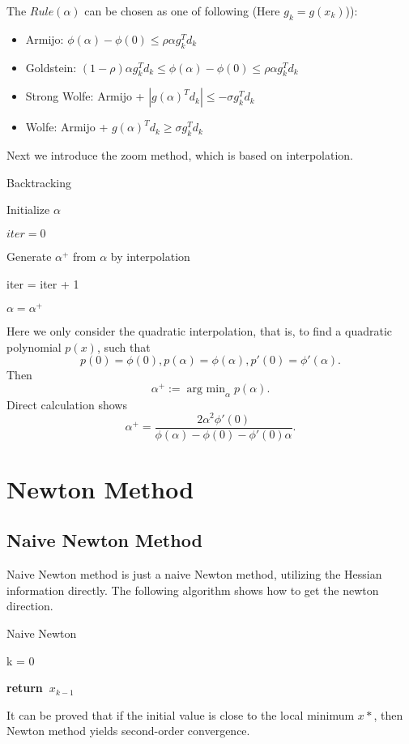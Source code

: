 \documentclass{article}
\newcommand{\return}{\textbf{return~}}
\DeclareMathOperator{\argmin}{arg~min}
\begin{document}
The $Rule(\alpha)$ can be chosen as one of following (Here $g_k = g(x_k)$)):
\begin{itemize}
	\item Armijo: $\phi(\alpha) - \phi(0) \le \rho\alpha g_k^Td_k$
	\item Goldstein:  $(1-\rho)\alpha g_k^Td_k \le \phi(\alpha) - \phi(0) \le \rho\alpha g_k^Td_k$
	\item Strong Wolfe: Armijo + $|g(\alpha)^Td_k| \le -\sigma g_k^Td_k$
	\item Wolfe: Armijo +  $g(\alpha)^Td_k \ge \sigma g_k^Td_k$
\end{itemize}

Next we introduce the zoom method, which is based on interpolation. 

\begin{algorithm}[H]
	\caption{Backtracking}
	\KwIn{$\phi$}
	\KwOut{$\alpha$}
	Initialize $\alpha$
	
	$iter = 0$
	
	{Generate $\alpha^+$ from $\alpha$ by interpolation
		
		iter = iter + 1
	
$\alpha = \alpha^+$}
\end{algorithm}
Here we only consider the quadratic interpolation, that is, to find a quadratic polynomial $p(x)$, such that $$p(0) = \phi(0), p(\alpha) = \phi(\alpha), p'(0) = \phi'(\alpha).$$ Then $$\alpha^+ := \argmin_{\alpha} p(\alpha).$$ Direct calculation shows 
$$\alpha^+ = \frac{2\alpha^2\phi'(0)}{\phi(\alpha) - \phi(0) - \phi'(0)\alpha}.$$


\section{Newton Method}
\subsection{Naive Newton Method}
Naive Newton method is just a naive Newton method, utilizing the Hessian information directly. 
The following algorithm shows how to get the newton direction.
\begin{algorithm}
	\DontPrintSemicolon
	\label{alg:newton}
	\caption{Naive Newton}
	k = 0
	

\return $x_{k-1}$
\end{algorithm}
It can be proved that if the initial value is close to the local minimum $x*$, then Newton method yields second-order convergence.
\end{document}
